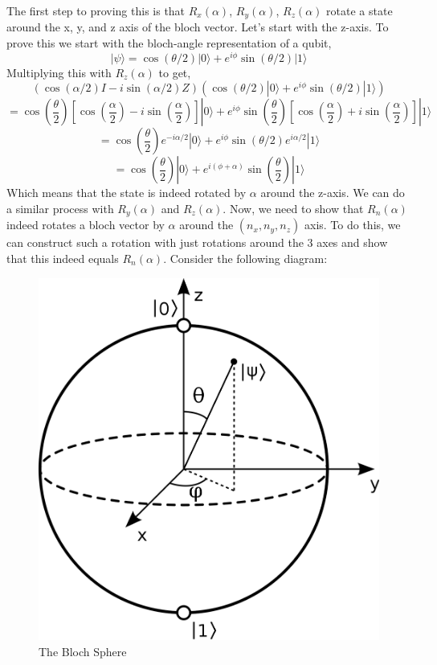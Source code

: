 The first step to proving this is that $R_x(\alpha)$, $R_y(\alpha)$, $R_z(\alpha)$ rotate a state around the x, y, and z axis of the bloch vector. Let’s start with the z-axis. To prove this we start with the bloch-angle representation of a qubit,
$$|\psi \rangle = \cos(\theta /2)|0\rangle + e^{i\phi}\sin(\theta /2)|1\rangle$$
Multiplying this with $R_z(\alpha)$ to get,
$$(\cos(\alpha /2)I - i\sin(\alpha /2)Z)(\cos(\theta /2)|0\rangle + e^{i\phi}\sin(\theta /2)|1\rangle)$$
$$= \cos(\frac{\theta}{2})\left[ \cos(\frac{\alpha}{2}) - i\sin(\frac{\alpha}{2}) \right]|0\rangle + e^{i\phi}\sin(\frac{\theta}{2})\left[ \cos(\frac{\alpha}{2}) + i\sin(\frac{\alpha}{2}) \right]|1\rangle$$
$$= \cos(\frac{\theta}{2})e^{-i\alpha /2}|0\rangle + e^{i\phi}\sin(\theta /2)e^{i\alpha /2}|1\rangle$$
$$= \cos(\frac{\theta}{2})|0\rangle + e^{i(\phi + \alpha)}\sin(\frac{\theta}{2})|1\rangle$$
Which means that the state is indeed rotated by $\alpha$ around the z-axis. We can do a similar process with $R_y(\alpha)$ and $R_z(\alpha)$. Now, we need to show that $R_n(\alpha)$ indeed rotates a bloch vector by $\alpha$ around the $(n_x, n_y, n_z)$ axis. To do this, we can construct such a rotation with just rotations around the 3 axes and show that this indeed equals $R_n(\alpha)$. Consider the following diagram:

\begin{figure}
    \centering
    \includegraphics[width = \linewidth]{Chapter 4/4.6.png}
    \caption{The Bloch Sphere}
    \label{fig:my_label}
\end{figure}

